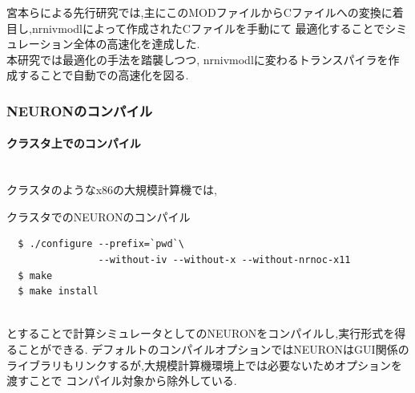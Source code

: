 宮本らによる先行研究\cite{miyamoto-master}では,主にこのMODファイルからCファイルへの変換に着目し,nrnivmodlによって作成されたCファイルを手動にて
最適化することでシミュレーション全体の高速化を達成した.\\
本研究では最適化の手法を踏襲しつつ, nrnivmodlに変わるトランスパイラを作成することで自動での高速化を図る.\\

\subsubsection{NEURONのコンパイル}
\paragraph{クラスタ上でのコンパイル}~\\
クラスタのようなx86の大規模計算機では,\\
\begin{table}[!ht]
  \caption {クラスタでのNEURONのコンパイル}
{\footnotesize
\begin{framed}
\begin{verbatim}
  $ ./configure --prefix=`pwd`\
                --without-iv --without-x --without-nrnoc-x11
  $ make
  $ make install
\end{verbatim}
\end{framed}
}
\end{table}
\\
とすることで計算シミュレータとしてのNEURONをコンパイルし,実行形式を得ることができる.
デフォルトのコンパイルオプションではNEURONはGUI関係のライブラリもリンクするが,大規模計算機環境上では必要ないためオプションを渡すことで
コンパイル対象から除外している.\\
